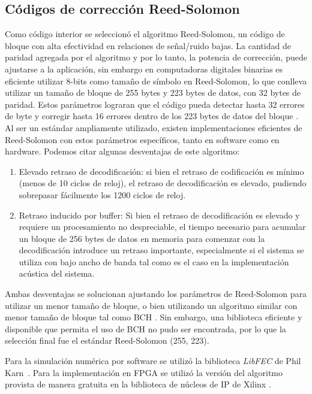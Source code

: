 \subsection{Códigos de corrección Reed-Solomon}
Como código interior se seleccionó el algoritmo Reed-Solomon, un código de bloque con alta efectividad en relaciones de señal/ruido bajas. La cantidad de paridad agregada por el algoritmo y por lo tanto, la potencia de corrección, puede ajustarse a la aplicación, sin embargo en computadoras digitales binarias es eficiente utilizar 8-bits como tamaño de símbolo en Reed-Solomon, lo que conlleva utilizar un tamaño de bloque de 255 bytes y 223 bytes de datos, con 32 bytes de paridad. Estos parámetros lograran que el código pueda detectar hasta 32 errores de byte y corregir hasta 16 errores dentro de los 223 bytes de datos del bloque \cite{wicker1999reed}. Al ser un estándar ampliamente utilizado, existen implementaciones eficientes de Reed-Solomon con estos parámetros específicos, tanto en software como en hardware.
Podemos citar algunas desventajas de este algoritmo:
\begin{enumerate}
 \item Elevado retraso de decodificación: si bien el retraso de codificación es mínimo (menos de 10 ciclos de reloj), el retraso de decodificación es elevado, pudiendo sobrepasar fácilmente los 1200 ciclos de reloj.
 \item Retraso inducido por buffer: Si bien el retraso de decodificación es elevado y requiere un procesamiento no despreciable, el tiempo necesario para acumular un bloque de 256 bytes de datos en memoria para comenzar con la decodificación introduce un retraso importante, especialmente si el sistema se utiliza con bajo ancho de banda tal como es el caso en la implementación acústica del sistema.
\end{enumerate}
 
Ambas desventajas se solucionan ajustando los parámetros de Reed-Solomon para utilizar un menor tamaño de bloque, o bien utilizando un algoritmo similar con menor tamaño de bloque tal como BCH \cite{bose1960class}. Sin embargo, una biblioteca eficiente y disponible que permita el uso de BCH no pudo ser encontrada, por lo que la selección final fue el estándar Reed-Solomon (255, 223).

Para la simulación numérica por software se utilizó la biblioteca \textit{LibFEC} de Phil Karn~\cite{libfec}. Para la implementación en FPGA se utilizó la versión del algoritmo provista de manera gratuita en la biblioteca de núcleos de IP de Xilinx \cite{Xilinx:DS251}.

